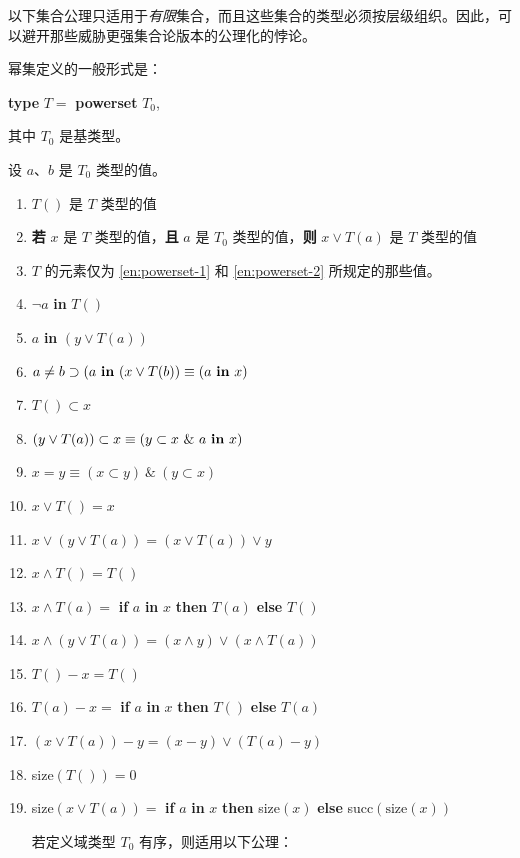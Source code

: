 以下集合公理只适用于\textit{有限}集合，而且这些集合的类型必须按层级组织。因此，可以避开那些威胁更强集合论版本的公理化的悖论。

幂集定义的一般形式是：

\quad \textbf{type} $T =$ \textbf{powerset} $T_0$,

\noindent
其中 $T_0$ 是基类型。

\noindent
设 $a$、$b$ 是 $T_0$ 类型的值。

\begin{enumerate}[wide, nosep, label=(\arabic*)]
	\item \label{en:powerset-1}
	$T()$ 是 $T$ 类型的值
	\item \label{en:powerset-2}
	\textbf{若} $x$ 是 $T$ 类型的值，\textbf{且} $a$ 是 $T_0$ 类型的值，\textbf{则} $x \vee T(a)$ 是 $T$ 类型的值
	\item $T$ 的元素仅为 \ref{en:powerset-1} 和 \ref{en:powerset-2} 所规定的那些值。
	\item $\neg a$ \textbf{in} $T()$
	\item $a$ \textbf{in} $(y \lor T(a))$
	\item $a \neq b \supset (a \text{ \textbf{in} } (x \lor T(b)) \equiv (a \text{ \textbf{in} } x)$
	\item $T() \subset x$
	\item $(y \lor T(a)) \subset x \equiv (y \subset x\ \&\ a \text{ \textbf{in} } x)$
	\item $x = y \equiv (x \subset y)\ \&\ (y \subset x)$
	\setcounter{enumi}{9}
	\item $x \lor T() = x$
	\item $x \lor (y \lor T(a)) = (x \lor T(a)) \lor y$
	\item $x \land T() = T()$
	\item $x \land T(a) =$ \textbf{if} $a$ \textbf{in} $x$ \textbf{then} $T(a)$ \textbf{else} $T()$
	\item $x \land (y \lor T(a)) = (x \land y) \lor (x \land T(a))$
	\item $T() - x = T()$
	\item $T(a) - x =$ \textbf{if} $a$ \textbf{in} $x$ \textbf{then} $T()$ \textbf{else} $T(a)$
	\item $(x \lor T(a)) - y = (x - y) \lor (T(a) - y)$
	\item size$(T()) = 0$
	\item size$(x \lor T(a)) =$ \textbf{if} $a$ \textbf{in} $x$ \textbf{then} size$(x)$ \textbf{else} succ$(\text{size}(x))$

	若定义域类型 $T_0$ 有序，则适用以下公理：


\end{enumerate}
